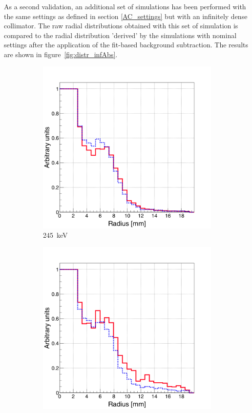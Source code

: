 As a second validation, an additional set of simulations has been performed with the same settings as defined in section \ref{AC_settings} but with an infinitely dense collimator. The raw radial distributions obtained with this set of simulation is compared to the radial distribution 'derived' by the simulations with nominal settings after the application of the fit-based background subtraction. The results are shown in figure~\ref{fig:distr_infAbs}.

\begin{figure}
\begin{subfigure}{.5\textwidth}
  \centering
  \includegraphics[width=.9\linewidth]{03_GraphicFiles/chapter4/SPECT/anger/inf_abs/overlap_infAbs_245keV_normMax}
  \caption{245~keV}
  \label{fig:rad_distr_infAbs_245keV}
\end{subfigure}
\begin{subfigure}{.5\textwidth}
  \centering
  \includegraphics[width=.9\linewidth]{03_GraphicFiles/chapter4/SPECT/anger/inf_abs/overlap_infAbs_555keV_normMax}

\end{subfigure}
\end{figure}
